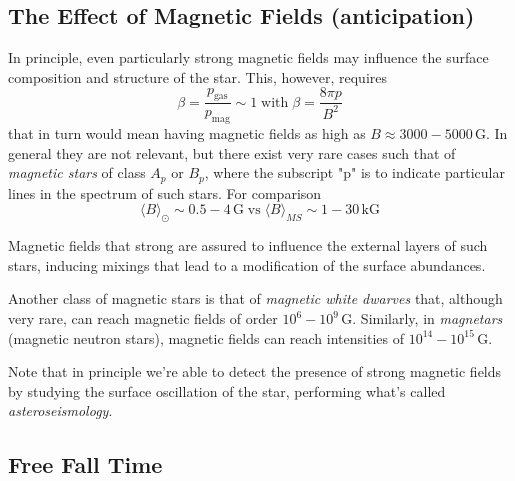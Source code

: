 \subsection*{The Effect of Magnetic Fields (anticipation)}
\par In principle, even particularly strong magnetic fields may influence the surface composition and structure of the star. This, however, requires
\begin{equation*}
	\beta = \frac{p_{\text{gas}}}{p_{\text{mag}}} \sim 1 \; \text{with} \; \beta = \frac{8\pi p}{B^{2}}
\end{equation*}
that in turn would mean having magnetic fields as high as $B \approx 3000-5000\,\text{G}$. In general they are not relevant, but there exist very rare cases such that of \emph{magnetic stars} of class $A_{p}$ or $B_{p}$, where the subscript "p" is to indicate particular lines in the spectrum of such stars. For comparison
\begin{equation*}
	\langle B \rangle _{\odot} \sim 0.5-4\,\text{G} \; \text{vs} \; \langle B \rangle _{MS} \sim 1-30\,\text{kG}
\end{equation*}
\par Magnetic fields that strong are assured to influence the external layers of such stars, inducing mixings that lead to a modification of the surface abundances.
\par Another class of magnetic stars is that of \emph{magnetic white dwarves} that, although very rare, can reach magnetic fields of order $10^{6}-10^{9}\,\text{G}$. Similarly, in \emph{magnetars} (magnetic neutron stars), magnetic fields can reach intensities of $10^{14}-10^{15}\,\text{G}$.
\par Note that in principle we're able to detect the presence of strong magnetic fields by studying the surface oscillation of the star, performing what's called \emph{asteroseismology}.

\subsection{Free Fall Time}

